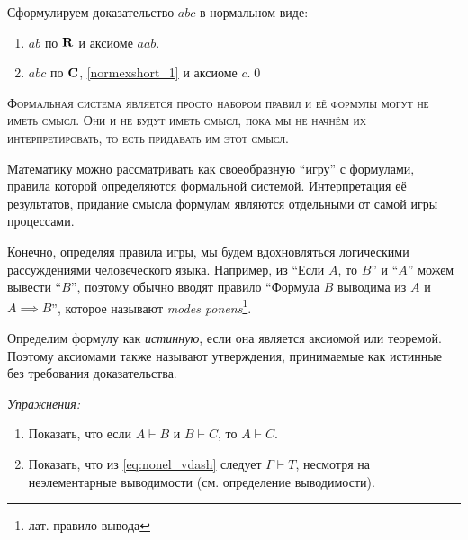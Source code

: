 Сформулируем доказательство $abc$ в нормальном виде:
\begin{enumerate}[label=(\arabic*)]
  \item{}\label{normexshort_1}$ab$ по $\mathbf{R}$ и аксиоме $aab$.
  \item{}\label{normexshort_2}$abc$ по $\mathbf{C}$,
  \ref{normexshort_1} и аксиоме $c$.\qed
\end{enumerate}

\textsc{Формальная система является просто набором правил и её формулы
  могут не иметь смысл. Они и не будут иметь смысл, пока мы не начнём их
  интерпретировать, то есть придавать им этот смысл.}

Математику можно рассматривать как своеобразную ``игру'' с формулами,
правила которой определяются формальной системой.
Интерпретация её результатов, придание смысла формулам являются
отдельными от самой игры процессами.

Конечно, определяя правила игры, мы будем вдохновляться логическими рассуждениями
человеческого языка.
Например, из ``Если $A$, то $B$'' и ``$A$'' можем вывести ``$B$'', поэтому обычно
вводят правило ``Формула $B$ выводима из $A$ и $A\implies B$'',
которое называют {\it modes ponens}\footnote{лат. правило вывода}.

Определим формулу
как {\it истинную}, если она является аксиомой или теоремой.
Поэтому аксиомами также называют утверждения, принимаемые как истинные
без требования доказательства.

\vspace{1em}
{\it Упражнения:}
\begin{enumerate}
  \item{}Показать, что если $A\vdash B$ и $B\vdash C$, то $A\vdash C$.
  \item{}Показать, что из \eqref{eq:nonel_vdash} следует $\Gamma\vdash T$,
  несмотря на неэлементарные выводимости (см. определение выводимости).
\end{enumerate}


